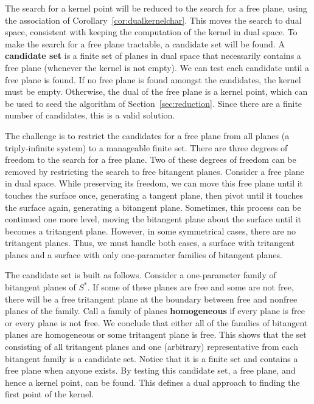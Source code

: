 \documentclass[12pt]{article}
\begin{document}
The search for a kernel point will be reduced to the search for a free plane,
using the association of Corollary~\ref{cor:dualkernelchar}.
This moves the search to dual space, consistent with keeping the computation
of the kernel in dual space.
To make the search for a free plane tractable, a candidate set will be found.
A {\bf candidate set} is a finite set of planes in dual space
that necessarily contains a free plane (whenever the kernel is not empty).
We can test each candidate until a free plane is found.
If no free plane is found amongst the candidates,
the kernel must be empty.
Otherwise, the dual of the free plane is a kernel point,
which can be used to seed the algorithm of Section~\ref{sec:reduction}.
Since there are a finite number of candidates, this is a valid solution.

The challenge is to restrict the candidates for a free plane from
all planes (a triply-infinite system) to a manageable finite set.
There are three degrees of freedom to the search for a free plane.
Two of these degrees of freedom can be removed by restricting the search
to free bitangent planes.
Consider a free plane in dual space.
While preserving its freedom, we can move this free plane
until it touches the surface once, generating a tangent plane,
then pivot until it touches the surface again, generating a bitangent plane.
Sometimes, this process can be continued one more level,
moving the bitangent plane about the surface until it becomes a
tritangent plane.
However, in some symmetrical cases, there are no tritangent planes.
Thus, we must handle both cases, a surface with tritangent planes
and a surface with only one-parameter families of bitangent planes.

The candidate set is built as follows.
Consider a one-parameter family of bitangent planes of $S^*$.
If some of these planes are free and some are not free,
there will be a free tritangent plane at the boundary
between free and nonfree planes of the family.
Call a family of planes {\bf homogeneous} if every plane is
free or every plane is not free.
We conclude that either all of the families of bitangent planes
are homogeneous or some tritangent plane is free.
This shows that the set consisting of all tritangent planes
and one (arbitrary) representative from each bitangent family
is a candidate set.
Notice that it is a finite set and contains a free plane when anyone exists.
By testing this candidate set, a free plane, and hence a kernel point, can be found.
This defines a dual approach to finding the first point of the kernel.
\end{document}
